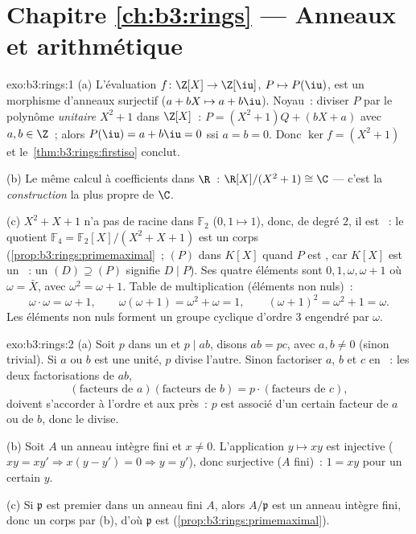 \section*{Chapitre \ref{ch:b3:rings} --- Anneaux et arithmétique}

\begin{solution}{exo:b3:rings:1}
(a) L'évaluation $f \colon \Z[X] \to \Z[\iu]$, $P \mapsto
P(\iu)$, est un morphisme d'anneaux surjectif ($a + bX \mapsto a
+ b\iu$). Noyau~: diviser $P$ par le polynôme \emph{unitaire}
$X^2 + 1$ dans $\Z[X]$~: $P = (X^2 + 1)Q + (bX + a)$ avec $a, b
\in \Z$~; alors $P(\iu) = a + b\iu = 0$ ssi $a = b = 0$. Donc
$\ker f = (X^2+1)$ et le~\cref{thm:b3:rings:firstiso} conclut.

(b) Le même calcul à coefficients dans $\R$~: $\R[X]/(X^2+1)
\cong \C$ --- c'est la \emph{construction} la plus propre de
$\C$.

(c) $X^2 + X + 1$ n'a pas de racine dans $\mathbb F_2$ ($0, 1
\mapsto 1$), donc, de degré $2$, il est ~: le
quotient $\mathbb F_4 = \mathbb F_2[X]/(X^2+X+1)$ est un corps
(\cref{prop:b3:rings:primemaximal}~; $(P)$  dans $K[X]$
quand $P$ est , car $K[X]$ est un ~: un 
$(D) \supseteq (P)$ signifie $D \mid P$). Ses quatre éléments
sont $0, 1, \omega, \omega + 1$ où $\omega = \bar X$, avec
$\omega^2 = \omega + 1$. Table de multiplication (éléments non
nuls)~:
\[
\omega \cdot \omega = \omega + 1, \qquad
\omega(\omega + 1) = \omega^2 + \omega = 1, \qquad
(\omega+1)^2 = \omega^2 + 1 = \omega .
\]
Les éléments non nuls forment un groupe cyclique d'ordre $3$
engendré par $\omega$.
\end{solution}

\begin{solution}{exo:b3:rings:2}
(a) Soit $p$  dans un  et $p \mid ab$, disons $ab
= pc$, avec $a, b \neq 0$ (sinon trivial). Si $a$ ou $b$ est une
unité, $p$ divise l'autre. Sinon factoriser $a$, $b$ et $c$ en
~: les deux factorisations de $ab$,
\[
(\text{facteurs de } a)(\text{facteurs de } b) = p \cdot
(\text{facteurs de } c),
\]
doivent s'accorder à l'ordre et aux  près~: $p$ est
associé d'un certain facteur  de $a$ ou de $b$, donc
le divise.

(b) Soit $A$ un anneau intègre fini et $x \neq 0$. L'application
$y \mapsto xy$ est injective ($xy = xy' \Rightarrow x(y - y') =
0 \Rightarrow y = y'$), donc surjective ($A$ fini)~: $1 = xy$
pour un certain $y$.

(c) Si $\mathfrak p$ est premier dans un anneau fini $A$, alors
$A/\mathfrak p$ est un anneau intègre fini, donc un corps par
(b), d'où $\mathfrak p$ est 
(\cref{prop:b3:rings:primemaximal}).
\end{solution}

